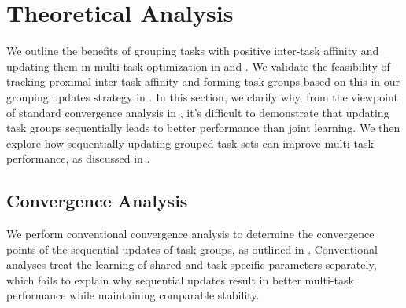 \section{Theoretical Analysis}
\label{sec:theoretical_analysis}
We outline the benefits of grouping tasks with positive inter-task affinity and updating them in multi-task optimization in  and . We validate the feasibility of tracking proximal inter-task affinity and forming task groups based on this in our grouping updates strategy in . In this section, we clarify why, from the viewpoint of standard convergence analysis in , it's difficult to demonstrate that updating task groups sequentially leads to better performance than joint learning. We then explore how sequentially updating grouped task sets can improve multi-task performance, as discussed in .

\subsection{Convergence Analysis}
We perform conventional convergence analysis to determine the convergence points of the sequential updates of task groups, as outlined in . Conventional analyses treat the learning of shared and task-specific parameters separately, which fails to explain why sequential updates result in better multi-task performance while maintaining comparable stability.

